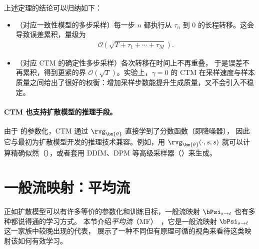 上述定理的结论可以归纳如下：
\begin{itemize}
    \item {}（对应一致性模型的多步采样）每一步 $n$ 都执行从 $\tau_n$ 到 $0$ 的长程转移。这会导致误差累积，量级为
    \begin{align*}
        \mathcal{O}\left(\sqrt{T + \tau_1 + \cdots + \tau_M}\right).
    \end{align*}

    \item {}（对应 CTM 的确定性多步采样）各次转移在时间上不再重叠，
    于是误差不再累积，得到更紧的界 $\mathcal{O}(\sqrt{T})$。实验上，$\gamma = 0$ 的 CTM 在采样速度与样本质量之间给出了很好的权衡：增加采样步数能提升生成质量，又不会引入不稳定。
\end{itemize}


\paragraph{CTM 也支持扩散模型的推理手段。}
由于  的参数化，CTM 通过 $\rvg_{\bm{\theta}}$ 直接学到了分数函数（即降噪器），
因此它与最初为扩散模型开发的推理技术兼容。例如，用 $\rvg_{\bm{\theta}}(\cdot, s, s)$
就可以计算精确似然（），或者套用 DDIM、DPM 等高级采样器（）来生成。


\section{\texorpdfstring{一般流映射：平均流}{一般流映射：平均流}}\label{sec:MF}


正如扩散模型可以有许多等价的参数化和训练目标，一般流映射 $\bPsi_{s\to t}$ 也有多种都说得通的学习方式。
本节介绍\emph{平均流}（MF）~\citep{geng2025mean}，它是一般流映射 $\bPsi_{s\to t}$ 这一家族中较晚出现的代表，
展示了一种不同但有原理可循的视角来看待这类映射该如何有效学习。


